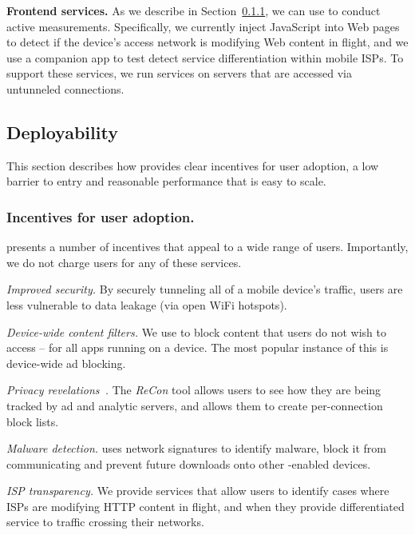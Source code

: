 \noindent\textbf{Frontend services.} As we describe in Section~\ref{}, we can use 
\meddle to conduct active measurements. 
Specifically, we currently inject JavaScript into Web pages to detect if the device's 
access network is modifying Web content in flight, and we use a companion app to 
test detect service differentiation within mobile ISPs. To support these services, we 
run services on \meddle servers that are accessed via untunneled connections. 

\subsection{Deployability}
\label{subsec:design_deploy}

This section describes how \meddle provides clear incentives for user adoption, a 
low barrier to entry and reasonable performance that is easy to scale.

\subsubsection{Incentives for user adoption.} \meddle presents a number of incentives 
that appeal to a wide range of users. Importantly, we do not charge users for any of these 
services.

\begin{packeditemize}
\item \emph{Improved security.} By securely tunneling all of a mobile device's traffic, users 
are less vulnerable to data leakage (\eg via open WiFi hotspots). 
\item \emph{Device-wide content filters.} We use \meddle to block content that users do 
not wish to access -- for all apps running on a device. The most popular instance of this is 
device-wide ad blocking.
\item \emph{Privacy revelations~\cite{wetherall:revelations}.} The \emph{ReCon} tool allows users to see how they are being 
tracked by ad and analytic servers, and allows them to create per-connection block lists.  
\item \emph{Malware detection.} \meddle uses network signatures to identify malware, block it from 
communicating and prevent future downloads onto other \meddle-enabled devices.  
\item \emph{ISP transparency.} We provide services that allow users to identify cases where 
ISPs are modifying HTTP content in flight, and when they provide differentiated service to 
traffic crossing their networks.
\end{packeditemize}

